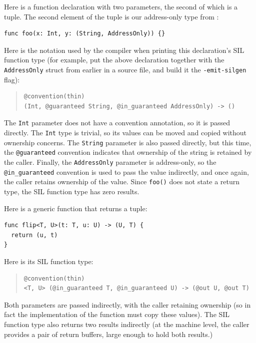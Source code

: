 \documentclass[../generics]{subfiles}
\begin{document}
\begin{example}
Here is a function declaration with two parameters, the second of which is a tuple. The second element of the tuple is our address-only type from :
\begin{Verbatim}
func foo(x: Int, y: (String, AddressOnly)) {}
\end{Verbatim}
Here is the notation used by the compiler when printing this declaration's SIL function type (for example, put the above declaration together with the \texttt{AddressOnly} struct from earlier in a source file, and build it the \verb|-emit-silgen| flag):
\begin{quote}
\begin{verbatim}
@convention(thin)
(Int, @guaranteed String, @in_guaranteed AddressOnly) -> ()
\end{verbatim}
\end{quote}
The \texttt{Int} parameter does not have a convention annotation, so it is passed directly. The \texttt{Int} type is trivial, so its values can be moved and copied without ownership concerns. The \texttt{String} parameter is also passed directly, but this time, the \verb|@guaranteed| convention indicates that ownership of the string is retained by the caller. Finally, the \texttt{AddressOnly} parameter is address-only, so the \verb|@in_guaranteed| convention is used to pass the value indirectly, and once again, the caller retains ownership of the value. Since \texttt{foo()} does not state a return type, the SIL function type has zero results.
\end{example}

\begin{example}
Here is a generic function that returns a tuple:
\begin{Verbatim}
func flip<T, U>(t: T, u: U) -> (U, T) {
  return (u, t)
}
\end{Verbatim}
Here is its SIL function type:
\begin{quote}
\begin{verbatim}
@convention(thin)
<T, U> (@in_guaranteed T, @in_guaranteed U) -> (@out U, @out T)
\end{verbatim}
\end{quote}
Both parameters are passed indirectly, with the caller retaining ownership (so in fact the implementation of the function must copy these values). The SIL function type also returns two results indirectly (at the machine level, the caller provides a pair of return buffers, large enough to hold both results.)
\end{example}
\end{document}
